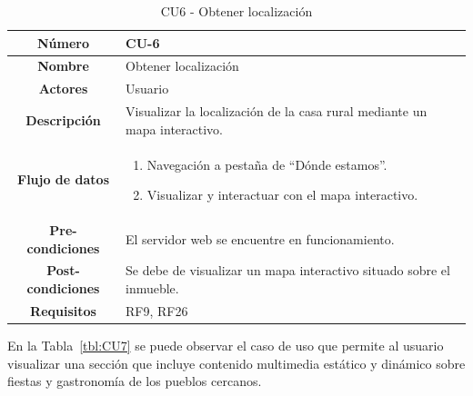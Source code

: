 \begin{table}[h!tb]
	\centering
	\begin{adjustbox}{width=1\textwidth}
	\begin{tabular}{|c|p{\textwidth}|}
		\hline {\bf Número} & CU-6 \\
		\hline {\bf Nombre} & Obtener localización\\
		\hline {\bf Actores} & Usuario \\
		\hline {\bf Descripción} & Visualizar la localización de la casa rural mediante un mapa interactivo. \\
		\hline {\bf Flujo de datos}
		& 
		\begin{enumerate}
			\item Navegación a pestaña de ``Dónde estamos''.
            \item Visualizar y interactuar con el mapa interactivo.
   
        \end{enumerate}\\
		\hline {\bf Pre-condiciones}
		& El servidor web se encuentre en funcionamiento. \\
		\hline {\bf Post-condiciones}
		& Se debe de visualizar un mapa interactivo situado sobre el inmueble. \\
    
		\hline {\bf Requisitos} & RF9, RF26 \\
		\hline 
	\end{tabular}
	\end{adjustbox}
	\caption{CU6 - Obtener localización\label{tbl:CU6}}
\end{table}
    En la Tabla~\ref{tbl:CU7} se puede observar el caso de uso que permite al usuario visualizar una sección que incluye contenido multimedia estático y dinámico sobre fiestas y gastronomía de los pueblos cercanos.
